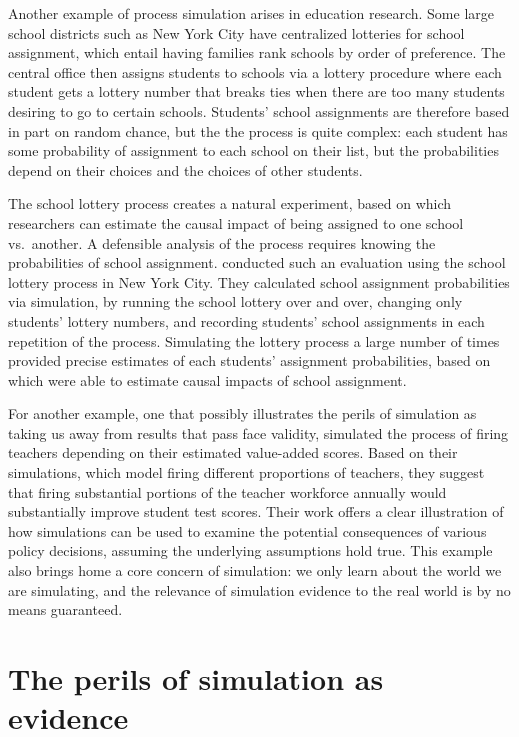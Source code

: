 \documentclass[
]{book}
\begin{document}
Another example of process simulation arises in education research.
Some large school districts such as New York City have centralized lotteries for school assignment, which entail having families rank schools by order of preference.
The central office then assigns students to schools via a lottery procedure where each student gets a lottery number that breaks ties when there are too many students desiring to go to certain schools.
Students' school assignments are therefore based in part on random chance, but the the process is quite complex: each student has some probability of assignment to each school on their list, but the probabilities depend on their choices and the choices of other students.

The school lottery process creates a natural experiment, based on which researchers can estimate the causal impact of being assigned to one school vs.~another.
A defensible analysis of the process requires knowing the probabilities of school assignment. \citet{abdulkadirouglu2017research} conducted such an evaluation using the school lottery process in New York City.
They calculated school assignment probabilities via simulation, by running the school lottery over and over, changing only students' lottery numbers, and recording students' school assignments in each repetition of the process.
Simulating the lottery process a large number of times provided precise estimates of each students' assignment probabilities, based on which \citet{abdulkadirouglu2017research} were able to estimate causal impacts of school assignment.

For another example, one that possibly illustrates the perils of simulation as taking us away from results that pass face validity, \citet{staiger2010searching} simulated the process of firing teachers depending on their estimated value-added scores.
Based on their simulations, which model firing different proportions of teachers, they suggest that firing substantial portions of the teacher workforce annually would substantially improve student test scores.
Their work offers a clear illustration of how simulations can be used to examine the potential consequences of various policy decisions, assuming the underlying assumptions hold true.
This example also brings home a core concern of simulation: we only learn about the world we are simulating, and the relevance of simulation evidence to the real world is by no means guaranteed.

\section{The perils of simulation as evidence}\label{the-perils-of-simulation-as-evidence}
\end{document}
